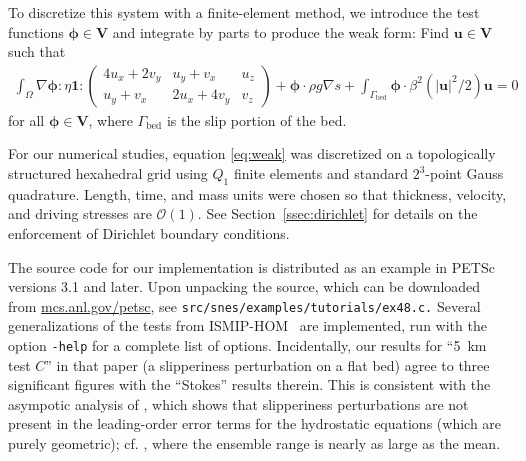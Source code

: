 \documentclass[draft,lineno,jgrga]{AGUTeX}
\newcommand{\href}[2]{#2}
\newcommand{\VV}{\bm V}
\newcommand{\bigO}{{\mathcal{O}}}
\newcommand{\abs}[1]{{\left\lvert #1 \right\rvert}}
\newcommand{\tcolon}{{ : }}
\begin{document}
\begin{article}
To discretize this system with a finite-element method, we introduce the test functions $\bm \phi
\in \VV$ and integrate by parts to produce the weak form: Find $\bm u \in \VV$ such that
\begin{align}\label{eq:weak}
  \int_\Omega \nabla\bm\phi \tcolon \eta \bm 1 \tcolon
  \begin{pmatrix}
    4 u_x + 2 v_y & u_y + v_x & u_z \\
    u_y + v_x & 2 u_x + 4 v_y & v_z
  \end{pmatrix} + \bm\phi \cdot\rho g \nabla s
  + \int_{\Gamma_{\text{bed}}} \bm \phi \cdot \beta^2(\abs{\bm u}^2/2) \bm u = 0
\end{align}
for all $\bm \phi \in \VV$, where $\Gamma_{\text{bed}}$ is the slip portion of the bed.

For our numerical studies, equation \eqref{eq:weak} was discretized on a topologically structured hexahedral grid using $Q_1$ finite elements and standard $2^3$-point Gauss quadrature.  Length, time, and mass units were chosen so that thickness, velocity, and driving stresses are $\bigO(1)$.  See Section~\ref{ssec:dirichlet} for details on the enforcement of Dirichlet boundary conditions.

The source code for our implementation is distributed as an example in PETSc~\citep{petsc-web-page} versions 3.1 and later.
Upon unpacking the source, which can be downloaded from \href{http://mcs.anl.gov/petsc}{\url{mcs.anl.gov/petsc}}, see \texttt{src/snes/examples/tutorials/ex48.c.}
Several generalizations of the tests from ISMIP-HOM~\citep{pattyn2008beh} are implemented, run with the option \texttt{-help} for a complete list of options.  Incidentally, our results for ``\SI{5}{\kilo\metre} test $C$'' in that paper (a slipperiness perturbation on a flat bed) agree to three significant figures with the ``Stokes'' results therein.  This is consistent with the asympotic analysis of \cite{schoof2010thin}, which shows that slipperiness perturbations are not present in the leading-order error terms for the hydrostatic equations (which are purely geometric); cf. \cite[Table~4 and Figure~8]{pattyn2008beh}, where the ensemble range is nearly as large as the mean.


\end{article}
\end{document}
